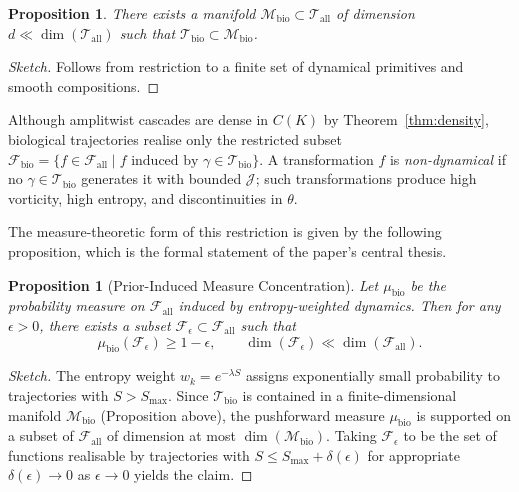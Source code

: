 \documentclass[12pt, a4paper]{article}
\newtheorem{proposition}[theorem]{Proposition}
\theoremstyle{remark}
\theoremstyle{definition}
\begin{document}
\begin{proposition}
There exists a manifold $\mathcal{M}_{\mathrm{bio}} \subset \mathcal{T}_{\mathrm{all}}$ of
dimension $d \ll \dim(\mathcal{T}_{\mathrm{all}})$ such that $\mathcal{T}_{\mathrm{bio}}
\subset \mathcal{M}_{\mathrm{bio}}$.
\end{proposition}

\begin{proof}[Sketch]
Follows from restriction to a finite set of dynamical primitives and smooth compositions.
\end{proof}

Although amplitwist cascades are dense in $C(K)$ by Theorem~\ref{thm:density}, biological
trajectories realise only the restricted subset $\mathcal{F}_{\mathrm{bio}} = \{f \in
\mathcal{F}_{\mathrm{all}} \mid f \text{ induced by } \gamma \in \mathcal{T}_{\mathrm{bio}}\}$.
A transformation $f$ is \emph{non-dynamical} if no $\gamma \in \mathcal{T}_{\mathrm{bio}}$
generates it with bounded $\mathcal{J}$; such transformations produce high vorticity, high
entropy, and discontinuities in $\theta$.

The measure-theoretic form of this restriction is given by the following proposition, which
is the formal statement of the paper's central thesis.

\begin{proposition}[Prior-Induced Measure Concentration]
\label{prop:concentration_app}
Let $\mu_{\mathrm{bio}}$ be the probability measure on $\mathcal{F}_{\mathrm{all}}$ induced
by entropy-weighted dynamics.  Then for any $\epsilon > 0$, there exists a subset
$\mathcal{F}_\epsilon \subset \mathcal{F}_{\mathrm{all}}$ such that
\[
\mu_{\mathrm{bio}}(\mathcal{F}_\epsilon) \ge 1 - \epsilon,
\qquad
\dim(\mathcal{F}_\epsilon) \ll \dim(\mathcal{F}_{\mathrm{all}}).
\]
\end{proposition}

\begin{proof}[Sketch]
The entropy weight $w_k = e^{-\lambda S}$ assigns exponentially small probability to
trajectories with $S > S_{\max}$.  Since $\mathcal{T}_{\mathrm{bio}}$ is contained in a
finite-dimensional manifold $\mathcal{M}_{\mathrm{bio}}$ (Proposition above), the pushforward
measure $\mu_{\mathrm{bio}}$ is supported on a subset of $\mathcal{F}_{\mathrm{all}}$ of
dimension at most $\dim(\mathcal{M}_{\mathrm{bio}})$.  Taking $\mathcal{F}_\epsilon$ to
be the set of functions realisable by trajectories with $S \le S_{\max} + \delta(\epsilon)$
for appropriate $\delta(\epsilon) \to 0$ as $\epsilon \to 0$ yields the claim.
\end{proof}
\end{document}
